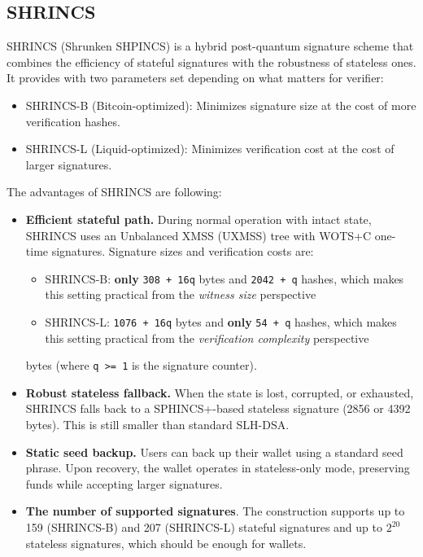 \subsection{SHRINCS} 
SHRINCS (Shrunken SHPINCS) is a hybrid post-quantum signature scheme that combines the efficiency of stateful signatures with the robustness of stateless ones. It provides with two parameters set depending on what matters for verifier:
    \begin{itemize}
        \item SHRINCS-B (Bitcoin-optimized): Minimizes signature size at the cost of more verification hashes.
        \item SHRINCS-L (Liquid-optimized): Minimizes verification cost at the cost of larger signatures.
    \end{itemize}
The advantages of SHRINCS are following: 
\begin{itemize}
    \item \textbf{Efficient stateful path.} During normal operation with intact state, SHRINCS uses an Unbalanced XMSS (UXMSS) tree with WOTS+C one-time signatures. Signature sizes and verification costs are:
    \begin{itemize}
        \item SHRINCS-B: \textbf{only} \texttt{308 + 16q} bytes and \texttt{2042 + q} hashes, which makes this setting practical from the \textit{witness size} perspective
        \item SHRINCS-L: \texttt{1076 + 16q} bytes and \textbf{only} \texttt{54 + q} hashes, which makes this setting practical from the \textit{verification complexity} perspective
    \end{itemize} 
    bytes (where \texttt{q >= 1} is the signature counter).
    \item \textbf{Robust stateless fallback.} When the state is lost, corrupted, or exhausted, SHRINCS falls back to a SPHINCS+-based stateless signature (2856 or 4392 bytes). This is still smaller than standard SLH-DSA.
    \item \textbf{Static seed backup.} Users can back up their wallet using a standard seed phrase. Upon recovery, the wallet operates in stateless-only mode, preserving funds while accepting larger signatures.
    \item \textbf{The number of supported signatures}. The construction supports up to 159 (SHRINCS-B) and 207 (SHRINCS-L) stateful signatures and up to $2^{20}$ stateless signatures, which should be enough for wallets. 
\end{itemize}

